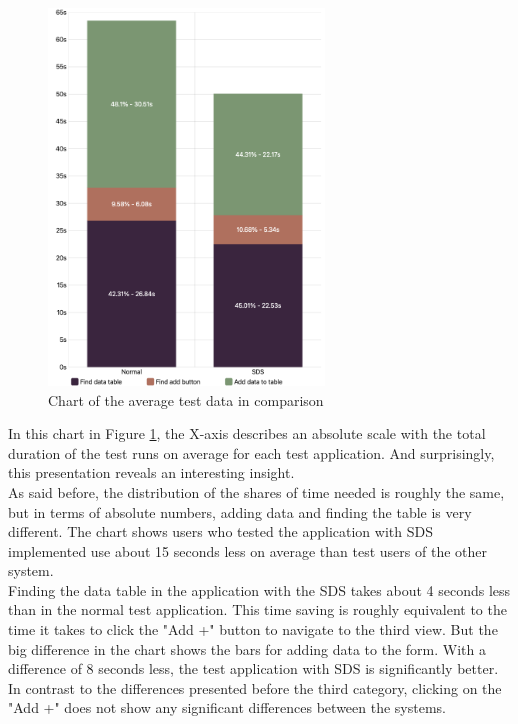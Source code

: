 \begin{figure}[htbp]
    \centerline{
    \includegraphics[height=10cm]{images/compare_avarages_test_data_chart.png}}
\caption{Chart of the average test data in comparison}
\label{test_data_avarages_compare}
\end{figure}
In this chart in Figure \ref{test_data_avarages_compare}, the X-axis describes an absolute scale with the total duration of the test runs on average for each test application. And surprisingly, this presentation reveals an interesting insight. \\
As said before, the distribution of the shares of time needed is roughly the same, but in terms of absolute numbers, adding data and finding the table is very different. The chart shows users who tested the application with \ac{SDS} implemented use about 15 seconds less on average than test users of the other system. \\
Finding the data table in the application with the \ac{SDS} takes about 4 seconds less than in the normal test application. This time saving is roughly equivalent to the time it takes to click the "Add +" button to navigate to the third view. But the big difference in the chart shows the bars for adding data to the form. With a difference of 8 seconds less, the test application with \ac{SDS} is significantly better.\\
In contrast to the differences presented before the third category, clicking on the "Add +" does not show any significant differences between the systems. 